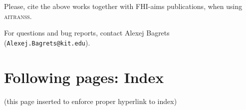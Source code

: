 \documentclass[12pt,a4paper,twoside,openany,titlepage,final]{book}
\begin{document}
Please, cite the above works together with 
FHI-aims publications, when using \textsc{aitranss}.

For questions and bug reports, contact
Alexej Bagrets (\verb,Alexej.Bagrets@kit.edu,).



\appendix
























\section*{Following pages: Index}
(this page inserted to enforce proper hyperlink to index)
\printindex
\end{document}
